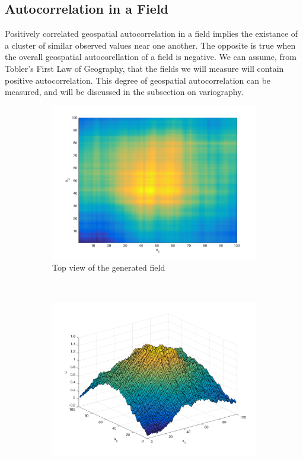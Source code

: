 \documentclass[11pt]{ucthesis}
\begin{document}
\subsection{Autocorrelation in a Field}
Positively correlated geospatial autocorrelation in a field implies the existance of a cluster of similar observed values near one another. The opposite is true when the overall geospatial autocorellation of a field is negative. We can assume, from Tobler's First Law of Geography, that the fields we will measure will contain positive autocorrelation. This degree of geospatial autocorrelation can be measured, and will be discussed in the subsection on variography.

\begin{figure}[ht!]
    \centering
    \begin{subfigure}[t]{0.5\textwidth}
        \centering
        \includegraphics[width=\linewidth]{figures/generated_field_top_view.png}
        \captionsetup{skip=0.5\baselineskip,size=footnotesize}
        \caption{Top view of the generated field}
		\label{fig:top_view_field}
    \end{subfigure}%
    ~ 
    \begin{subfigure}[t]{0.5\textwidth}
        \centering
        \includegraphics[width=\linewidth]{figures/generated_field_side_view.png}

\end{subfigure}
\end{figure}
\end{document}
